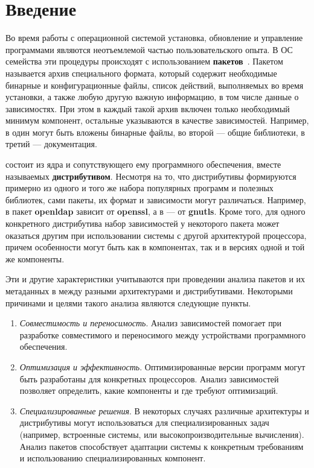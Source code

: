 
\section*{Введение}
\label{sec:intro}

Во время работы с операционной системой установка, обновление и управление программами являются неотъемлемой частью пользовательского опыта.
В ОС семейства {\linux} эти процедуры происходят с использованием \textbf{пакетов}~\cite{IntroductionToLinux}.
Пакетом называется архив специального формата, который содержит необходимые бинарные и конфигурационные файлы, список действий, выполняемых во время установки, а также любую другую важную информацию, в том числе данные о зависимостях.
При этом в каждый такой архив включен только необходимый минимум компонент, остальные указываются в качестве зависимостей.
Например, в один могут быть вложены бинарные файлы, во второй --- общие библиотеки, в третий --- документация.

{\linux} состоит из ядра и сопутствующего ему программного обеспечения, вместе называемых \textbf{дистрибутивом}.
Несмотря на то, что дистрибутивы формируются примерно из одного и того же набора популярных программ и полезных библиотек, сами пакеты, их формат и зависимости могут различаться.
Например, в {\centos} пакет \textbf{openldap} зависит от \textbf{openssl}, а в {\ubuntu} --- от \textbf{gnutls}.
Кроме того, для одного конкретного дистрибутива набор зависимостей у некоторого пакета может оказаться другим при использовании системы с другой архитектурой процессора, причем особенности могут быть как в компонентах, так и в версиях одной и той же компоненты.

Эти и другие характеристики учитываются при проведении анализа пакетов и их метаданных в {\linux} между разными архитектурами и дистрибутивами.
Некоторыми причинами и целями такого анализа являются следующие пункты.
\begin{enumerate}
	\item \textit{Совместимость и переносимость}. Анализ зависимостей помогает при разработке совместимого и переносимого между устройствами программного обеспечения.
	\item \textit{Оптимизация и эффективность}. Оптимизированные версии программ могут быть разработаны для конкретных процессоров. Анализ зависимостей позволяет определить, какие компоненты и где требуют оптимизаций.
	\item \textit{Специализированные решения}. В некоторых случаях различные архитектуры и дистрибутивы могут использоваться для специализированных задач (например, встроенные системы, или высокопроизводительные вычисления). Анализ пакетов способствует адаптации системы к конкретным требованиям и использованию специализированных компонент.
\end{enumerate}


